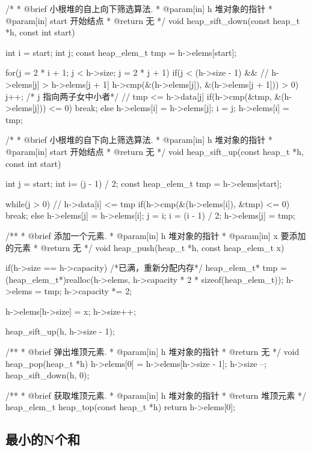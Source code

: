 \begin{Codex}[label=heap.c]
/*
 * @brief 小根堆的自上向下筛选算法.
 * @param[in] h 堆对象的指针
 * @param[in] start 开始结点
 * @return 无
 */
void heap_sift_down(const heap_t *h, const int start) {
    int i = start;
    int j;
    const heap_elem_t tmp = h->elems[start];

    for(j = 2 * i + 1; j < h->size; j = 2 * j + 1) {
        if(j < (h->size - 1) &&
            // h->elems[j] > h->elems[j + 1]
            h->cmp(&(h->elems[j]), &(h->elems[j + 1])) > 0) {
                j++; /* j 指向两子女中小者*/
        }
        // tmp <= h->data[j]
        if(h->cmp(&tmp, &(h->elems[j])) <= 0) {
            break;
        } else {
            h->elems[i] = h->elems[j];
            i = j;
        }
    }
    h->elems[i] = tmp;
}

/*
 * @brief 小根堆的自下向上筛选算法.
 * @param[in] h 堆对象的指针
 * @param[in] start 开始结点
 * @return 无
 */
void heap_sift_up(const heap_t *h, const int start) {
    int j = start;
    int i= (j - 1) / 2;
    const heap_elem_t tmp = h->elems[start];

    while(j > 0) {
        // h->data[i] <= tmp
        if(h->cmp(&(h->elems[i]), &tmp) <= 0) {
            break;
        } else {
            h->elems[j] = h->elems[i];
            j = i;
            i = (i - 1) / 2;
        }
    }
    h->elems[j] = tmp;
}

/**
 * @brief 添加一个元素.
 * @param[in] h 堆对象的指针
 * @param[in] x 要添加的元素
 * @return 无
 */
void heap_push(heap_t *h, const heap_elem_t x) {
    if(h->size == h->capacity) { /*已满，重新分配内存*/
        heap_elem_t* tmp =
            (heap_elem_t*)realloc(h->elems, h->capacity * 2 * sizeof(heap_elem_t));
        h->elems = tmp;
        h->capacity *= 2;
    }

    h->elems[h->size] = x;
    h->size++;

    heap_sift_up(h, h->size - 1);
}

/**
 * @brief 弹出堆顶元素.
 * @param[in] h 堆对象的指针
 * @return 无
 */
void heap_pop(heap_t *h) {
    h->elems[0] = h->elems[h->size - 1];
    h->size --;
    heap_sift_down(h, 0);
}

/**
 * @brief 获取堆顶元素.
 * @param[in] h 堆对象的指针
 * @return 堆顶元素
 */
heap_elem_t heap_top(const heap_t *h) {
    return h->elems[0];
}
\end{Codex}


\subsection{最小的N个和} %
